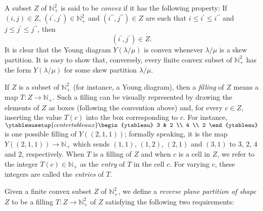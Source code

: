 \documentclass[numbers=enddot,12pt,final,onecolumn,notitlepage]{scrartcl}%
\theoremstyle{definition}
\begin{document}
A subset $Z$ of $\mathbb{N}_{+}^{2}$ is said to be \textit{convex} if it has
the following property: If $\left(  i,j\right)  \in Z$, $\left(  i^{\prime
},j^{\prime}\right)  \in\mathbb{N}_{+}^{2}$ and $\left(  i^{\prime\prime
},j^{\prime\prime}\right)  \in Z$ are such that $i\leq i^{\prime}\leq
i^{\prime\prime}$ and $j\leq j^{\prime}\leq j^{\prime\prime}$, then
\begin{equation}
\left(  i^{\prime},j^{\prime}\right)  \in Z. \label{eq.convex}%
\end{equation}
It is clear that the Young diagram $Y\left(  \lambda/\mu\right)  $ is convex
whenever $\lambda/\mu$ is a skew partition. It is easy to show that,
conversely, every finite convex subset of $\mathbb{N}_{+}^{2}$ has the form
$Y\left(  \lambda/\mu\right)  $ for some skew partition $\lambda/\mu$.

If $Z$ is a subset of $\mathbb{N}_{+}^{2}$ (for instance, a Young diagram),
then a \textit{filling} of $Z$ means a map $T:Z\rightarrow\mathbb{N}_{+}$.
Such a filling can be visually represented by drawing the elements of $Z$ as
boxes (following the convention above) and, for every $c\in Z$, inserting the
value $T\left(  c\right)  $ into the box corresponding to $c$. For instance, $%
\ytableausetup{centertableaux}
\begin{ytableau}
3 & 2 \\
4 \\
2
\end{ytableau}%
$ is one possible filling of $Y\left(  \left(  2,1,1\right)  \right)  $;
formally speaking, it is the map $Y\left(  \left(  2,1,1\right)  \right)
\rightarrow\mathbb{N}_{+}$ which sends $\left(  1,1\right)  $, $\left(
1,2\right)  $, $\left(  2,1\right)  $ and $\left(  3,1\right)  $ to $3$, $2$,
$4$ and $2$, respectively. When $T$ is a filling of $Z$ and when $c$ is a cell
in $Z$, we refer to the integer $T\left(  c\right)  \in\mathbb{N}_{+}$ as the
\textit{entry} of $T$ in the cell $c$. For varying $c$, these integers are
called the \textit{entries} of $T$.

Given a finite convex subset $Z$ of $\mathbb{N}_{+}^{2}$, we define a
\textit{reverse plane partition of shape }$Z$ to be a filling $T:Z\rightarrow
\mathbb{N}_{+}^{2}$ of $Z$ satisfying the following two requirements:
\end{document}
